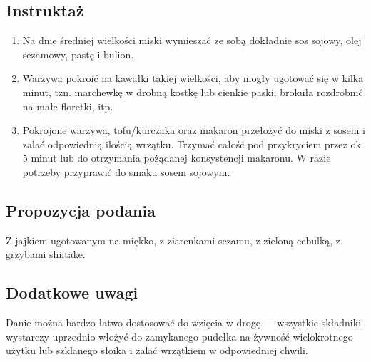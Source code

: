 \subsection*{Instruktaż}
\begin{enumerate}
    \item Na dnie średniej wielkości miski wymieszać ze sobą dokładnie sos sojowy, olej sezamowy, pastę i bulion.
    \item Warzywa pokroić na kawałki takiej wielkości, aby mogły ugotować się w kilka minut, tzn. marchewkę w drobną kostkę lub cienkie paski, brokuła rozdrobnić na małe floretki, itp.
    \item Pokrojone warzywa, tofu/kurczaka oraz makaron przełożyć do miski z sosem i zalać odpowiednią ilością wrzątku. Trzymać całość pod przykryciem przez ok. 5 minut lub do otrzymania pożądanej konsystencji makaronu. W razie potrzeby przyprawić do smaku sosem sojowym.
\end{enumerate}

\vspace{0.5cm}

\small \subsection*{Propozycja podania} Z jajkiem ugotowanym na miękko, z ziarenkami sezamu, z zieloną cebulką, z grzybami shiitake.

\vspace{0.3cm}

\subsection*{Dodatkowe uwagi} Danie można bardzo łatwo dostosować do wzięcia w drogę — wszystkie składniki wystarczy uprzednio włożyć do zamykanego pudełka na żywność wielokrotnego użytku lub szklanego słoika i zalać wrzątkiem w odpowiedniej chwili.

\newpage
